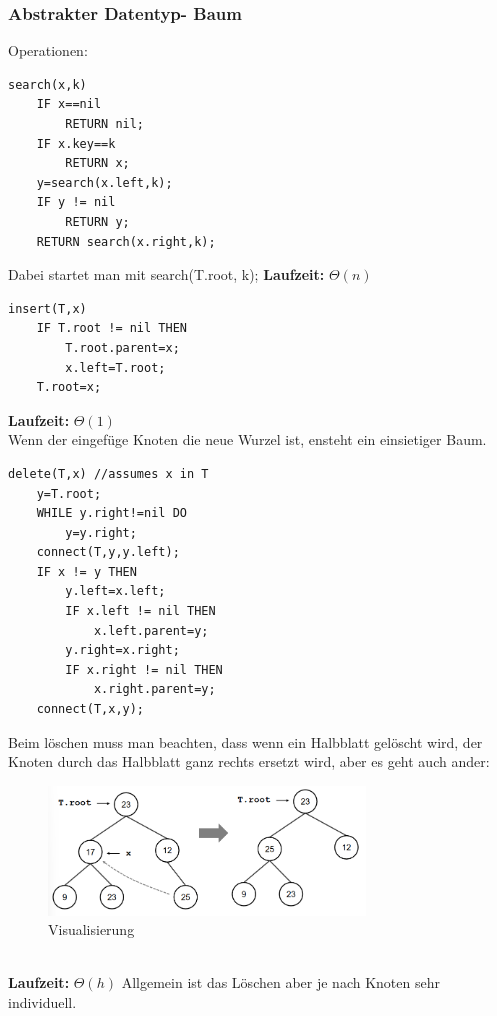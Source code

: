 \documentclass{article}
\begin{document}
            \subsubsection{Abstrakter Datentyp- Baum}
                Operationen:
                \begin{lstlisting}[style=pseudocode]
search(x,k)
    IF x==nil
        RETURN nil;
    IF x.key==k
        RETURN x;
    y=search(x.left,k);
    IF y != nil
        RETURN y;
    RETURN search(x.right,k);
                \end{lstlisting}
                Dabei startet man mit search(T.root, k); \textbf{Laufzeit:} $\Theta(n)$
                \begin{lstlisting}[style=pseudocode]
insert(T,x)
    IF T.root != nil THEN
        T.root.parent=x;
        x.left=T.root;
    T.root=x;
                \end{lstlisting}
                \textbf{Laufzeit:} $\Theta(1)$\\
                Wenn der eingefüge Knoten die neue Wurzel ist, ensteht ein einsietiger Baum.\\
                \begin{lstlisting}[style=pseudocode]
delete(T,x) //assumes x in T
    y=T.root;
    WHILE y.right!=nil DO
        y=y.right;
    connect(T,y,y.left);
    IF x != y THEN
        y.left=x.left;
        IF x.left != nil THEN
            x.left.parent=y;
        y.right=x.right;
        IF x.right != nil THEN
            x.right.parent=y;
    connect(T,x,y);
                \end{lstlisting}
                Beim löschen muss man beachten, dass wenn ein Halbblatt gelöscht wird, der Knoten durch das Halbblatt ganz rechts ersetzt wird, aber es geht auch ander:
                \begin{figure}[ht]
                    \centering
                    \includegraphics[width=0.75\textwidth]{Bilder/HalbblattBaum.png}
                    \caption{Visualisierung}
                    \label{fig:HalbblattBaum}
                \end{figure}\\
                \textbf{Laufzeit:} $\Theta(h)$
                Allgemein ist das Löschen aber je nach Knoten sehr individuell. 
\end{document}
